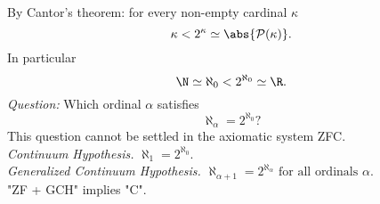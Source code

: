 \begin{remark}
    By Cantor's theorem: for every non-empty cardinal $\kappa$
    $$ \kappa < 2^\kappa \simeq \abs{\mathcal{P}(\kappa)}.$$
    In particular
    $$ \N \simeq \aleph_0 < 2^{\aleph_0} \simeq \R.$$
    \emph{Question:} Which ordinal $\alpha$ satisfies
    $$ \aleph_\alpha = 2^{\aleph_0}?$$
    This question cannot be settled in the axiomatic system ZFC.\\
    \emph{Continuum Hypothesis.} $\aleph_1 = 2^{\aleph_0}$.\\
    \emph{Generalized Continuum Hypothesis.} $\aleph_{\alpha + 1} = 2^{\aleph_\alpha} \text{ for all ordinals } \alpha$.\\
    "ZF + GCH" implies "C".
\end{remark}

